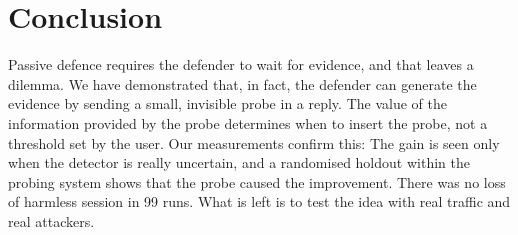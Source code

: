 \documentclass[runningheads]{llncs}
\begin{document}
\section{Conclusion}
Passive defence requires the defender to wait for evidence, and that leaves a dilemma. We have demonstrated that, in fact, the defender can generate the evidence by sending a small, invisible probe in a reply. The value of the information provided by the probe determines when to insert the probe, not a threshold set by the user. Our measurements confirm this: The gain is seen only when the detector is really uncertain, and a randomised holdout within the probing system shows that the probe caused the improvement. There was no loss of harmless session in 99 runs. What is left is to test the idea with real traffic and real attackers.



\end{document}
